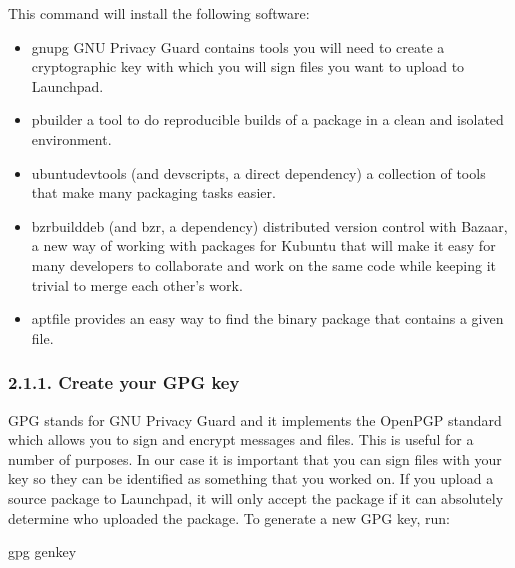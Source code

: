 \documentclass[letterpaper,10pt,english]{sphinxmanual}
\begin{document}
\sphinxAtStartPar
This command will install the following software:
\begin{itemize}
\item {} 
\sphinxAtStartPar
gnupg \textendash{} GNU Privacy Guard contains tools you will need to create a cryptographic key with which you will sign files you want to upload to Launchpad.

\item {} 
\sphinxAtStartPar
pbuilder \textendash{} a tool to do reproducible builds of a package in a clean and isolated environment.

\item {} 
\sphinxAtStartPar
ubuntu\sphinxhyphen{}dev\sphinxhyphen{}tools (and devscripts, a direct dependency) \textendash{} a collection of tools that make many packaging tasks easier.

\item {} 
\sphinxAtStartPar
bzr\sphinxhyphen{}builddeb (and bzr, a dependency) \textendash{} distributed version control with Bazaar, a new way of working with packages for Kubuntu that will make it easy for many developers to collaborate and work on the same code while keeping it trivial to merge each other’s work.

\item {} 
\sphinxAtStartPar
apt\sphinxhyphen{}file provides an easy way to find the binary package that contains a given file.

\end{itemize}


\subsubsection{2.1.1. Create your GPG key}
\label{\detokenize{docs/packaging-guide/getting-started:create-your-gpg-key}}
\sphinxAtStartPar
GPG stands for GNU Privacy Guard and it implements the OpenPGP standard which allows you to sign and encrypt messages and files. This is useful for a number of purposes. In our case it is important that you can sign files with your key so they can be identified as something that you worked on. If you upload a source package to Launchpad, it will only accept the package if it can absolutely determine who uploaded the package.
To generate a new GPG key, run:

\begin{sphinxVerbatim}[commandchars=\\\{\}]
\PYGZdl{} gpg \PYGZhy{}\PYGZhy{}gen\PYGZhy{}key
\end{sphinxVerbatim}
\end{document}
